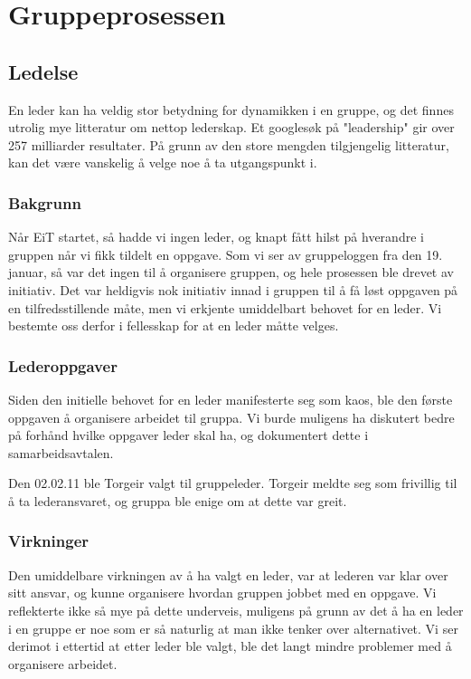 \chapter{Gruppeprosessen}
\section{Ledelse}
En leder kan ha veldig stor betydning for dynamikken i en gruppe, og det finnes
utrolig mye litteratur om nettop lederskap. Et googlesøk på "leadership" gir
over 257 milliarder resultater.
På grunn av den store mengden tilgjengelig litteratur, kan det være vanskelig å velge noe å ta utgangspunkt i.

\subsection{Bakgrunn}
Når EiT startet, så hadde vi ingen leder, og knapt fått hilst på hverandre i
gruppen når vi fikk tildelt en oppgave. Som vi ser av gruppeloggen fra den 19.
januar, så var det ingen til å organisere gruppen, og hele prosessen ble drevet
av initiativ. Det var heldigvis nok initiativ innad i gruppen til å få løst
oppgaven på en tilfredsstillende måte, men vi erkjente umiddelbart behovet for
en leder. Vi bestemte oss derfor i fellesskap for at en leder måtte velges.

\subsection{Lederoppgaver}
Siden den initielle behovet for en leder manifesterte seg som kaos, ble den
første oppgaven å organisere arbeidet til gruppa.
Vi burde muligens ha diskutert bedre på forhånd hvilke oppgaver leder skal ha,
og dokumentert dette i samarbeidsavtalen.

Den 02.02.11 ble Torgeir valgt til gruppeleder. Torgeir meldte seg som frivillig
til å ta lederansvaret, og gruppa ble enige om at dette var greit.

\subsection{Virkninger}
Den umiddelbare virkningen av å ha valgt en leder, var at lederen var klar over
sitt ansvar, og kunne organisere hvordan gruppen jobbet med en oppgave. Vi 
reflekterte ikke så mye på dette underveis, muligens på grunn av det å ha en
leder i en gruppe er noe som er så naturlig at man ikke tenker over
alternativet. Vi ser derimot i ettertid at etter leder ble valgt, ble det langt
mindre problemer med å organisere arbeidet.


